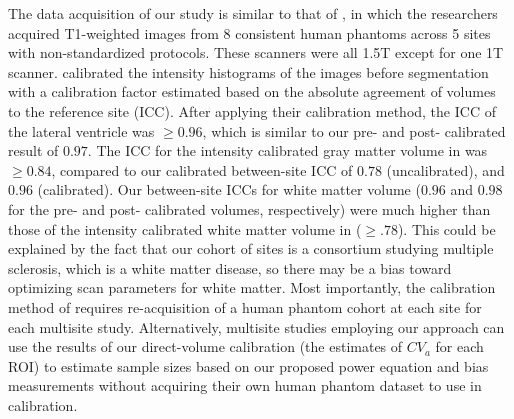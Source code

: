 \documentclass{article}
\begin{document}
The data acquisition of our study is similar to that of \cite{Schnack_2004}, in which the researchers acquired T1-weighted images from 8 consistent human phantoms across 5 sites with non-standardized protocols. These scanners were all 1.5T except for one 1T scanner. \cite{Schnack_2004} calibrated the intensity histograms of the images before segmentation with a calibration factor estimated based on the absolute agreement of volumes to the reference site (ICC). After applying their calibration method, the ICC of the lateral ventricle was $\geq 0.96$, which is similar to our pre- and post- calibrated result of $0.97$. The ICC for the intensity calibrated gray matter volume in \cite{Schnack_2004} was $\geq 0.84$, compared to our calibrated between-site ICC of $0.78$ (uncalibrated), and $0.96$ (calibrated). Our between-site ICCs for white matter volume ($0.96$ and $0.98$ for the pre- and post- calibrated volumes, respectively) were much higher than those of the intensity calibrated  white matter volume in \cite{Schnack_2004} ($\geq .78$). This could be explained by the fact that our cohort of sites is a consortium studying multiple sclerosis, which is a white matter disease, so there may be a bias toward optimizing scan parameters for white matter. Most importantly, the calibration method of \cite{Schnack_2004} requires re-acquisition of a human phantom cohort at each site for each multisite study. Alternatively, multisite studies employing our approach can use the results of our direct-volume calibration (the estimates of $CV_a$ for each ROI) to estimate sample sizes based on our proposed power equation and bias measurements without acquiring their own human phantom dataset to use in calibration.
\end{document}
